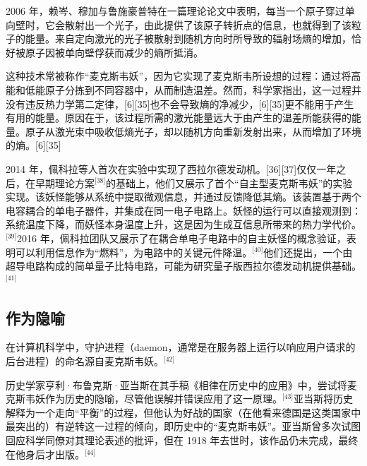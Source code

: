 2006 年，赖岑、穆加与鲁施豪普特在一篇理论论文中表明，每当一个原子穿过单向壁时，它会散射出一个光子，由此提供了该原子转折点的信息，也就得到了该粒子的能量。来自定向激光的光子被散射到随机方向时所导致的辐射场熵的增加，恰好被原子因被单向壁俘获而减少的熵所抵消。

这种技术常被称作“麦克斯韦妖”，因为它实现了麦克斯韦所设想的过程：通过将高能和低能原子分拣到不同容器中，从而制造温差。然而，科学家指出，这一过程并没有违反热力学第二定律，[6][35]也不会导致熵的净减少，[6][35]更不能用于产生有用的能量。原因在于，该过程所需的激光能量远大于由产生的温差所能获得的能量。原子从激光束中吸收低熵光子，却以随机方向重新发射出来，从而增加了环境的熵。[6][35]

2014 年，佩科拉等人首次在实验中实现了西拉尔德发动机。[36][37]仅仅一年之后，在早期理论方案\(^\text{[38]}\)的基础上，他们又展示了首个“自主型麦克斯韦妖”的实验实现。该妖怪能够从系统中提取微观信息，并通过反馈降低其熵。该装置基于两个电容耦合的单电子器件，并集成在同一电子电路上。妖怪的运行可以直接观测到：系统温度下降，而妖怪本身温度上升，这是因为生成互信息所带来的热力学代价。\(^\text{[39]}\)2016 年，佩科拉团队又展示了在耦合单电子电路中的自主妖怪的概念验证，表明可以利用信息作为“燃料”，为电路中的关键元件降温。\(^\text{[40]}\)他们还提出，一个由超导电路构成的简单量子比特电路，可能为研究量子版西拉尔德发动机提供基础。\(^\text{[41]}\)
\subsection{作为隐喻}
在计算机科学中，守护进程（daemon，通常是在服务器上运行以响应用户请求的后台进程）的命名源自麦克斯韦妖。\(^\text{[42]}\)

历史学家亨利·布鲁克斯·亚当斯在其手稿《相律在历史中的应用》中，尝试将麦克斯韦妖作为历史的隐喻，尽管他误解并错误应用了这一原理。\(^\text{[43]}\)亚当斯将历史解释为一个走向“平衡”的过程，但他认为好战的国家（在他看来德国是这类国家中最突出的）有逆转这一过程的倾向，即历史中的“麦克斯韦妖”。亚当斯曾多次试图回应科学同僚对其理论表述的批评，但在 1918 年去世时，该作品仍未完成，最终在他身后才出版。\(^\text{[44]}\)
